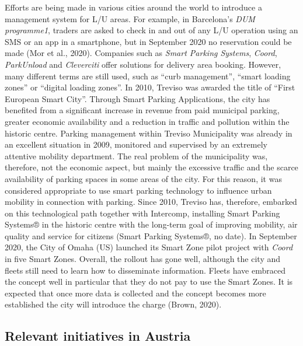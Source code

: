 \documentclass[
]{book}
\begin{document}
Efforts are being made in various cities around the world to introduce a management system for L/U areas. For example, in Barcelona's \emph{DUM programme1}, traders are asked to check in and out of any L/U operation using an SMS or an app in a smartphone, but in September 2020 no reservation could be made (Mor et al., 2020).
Companies such as \emph{Smart Parking Systems}, \emph{Coord}, \emph{ParkUnload} and \emph{Cleverciti} offer solutions for delivery area booking. However, many different terms are still used, such as ``curb management'', ``smart loading zones'' or ``digital loading zones''.
In 2010, Treviso was awarded the title of ``First European Smart City''. Through Smart Parking Applications, the city has benefited from a significant increase in revenue from paid municipal parking, greater economic availability and a reduction in traffic and pollution within the historic centre. Parking management within Treviso Municipality was already in an excellent situation in 2009, monitored and supervised by an extremely attentive mobility department.
The real problem of the municipality was, therefore, not the economic aspect, but mainly the excessive traffic and the scarce availability of parking spaces in some areas of the city. For this reason, it was considered appropriate to use smart parking technology to influence urban mobility in connection with parking. Since 2010, Treviso has, therefore, embarked on this technological path together with Intercomp, installing Smart Parking Systems® in the historic centre with the long-term goal of improving mobility, air quality and service for citizens (Smart Parking Systems®, no date).
In September 2020, the City of Omaha (US) launched its Smart Zone pilot project with \emph{Coord} in five Smart Zones. Overall, the rollout has gone well, although the city and fleets still need to learn how to disseminate information. Fleets have embraced the concept well in particular that they do not pay to use the Smart Zones. It is expected that once more data is collected and the concept becomes more established the city will introduce the charge (Brown, 2020).

\hypertarget{relevant-initiatives-in-austria-24}{%
\subsection*{Relevant initiatives in Austria}\label{relevant-initiatives-in-austria-24}}
\end{document}
